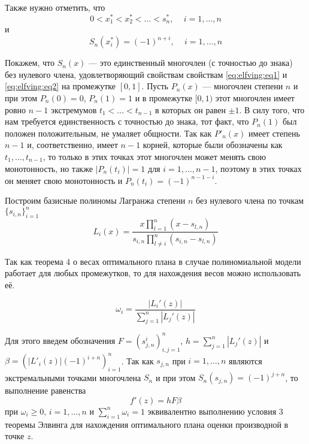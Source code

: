 \documentclass[specialist,
               substylefile = spbu.rtx,
               subf,href,colorlinks=true, 12pt]{disser}
\theoremstyle{definition}
\newcommand\abs[1]{\left\lvert#1\right\rvert}
\begin{document}
	Также нужно отметить, что
	\begin{equation*}
		0 < x_1^* < x_2^* < \ldots < s_n^* , \, \quad i = 1, \ldots, n 
	\end{equation*}
	и
	\begin{equation*}
		S_n(x_i^*) = (-1)^{n + i} , \, \quad i = 1, \ldots, n 
	\end{equation*}
	
	Покажем, что $S_n(x)$ --- это единственный многочлен (с точностью до знака) без нулевого члена, удовлетворяющий свойствам свойствам \eqref{eq:elfving:eq1} и \eqref{eq:elfving:eq2} на промежутке $[0, 1]$. Пусть $P_n(x)$ --- многочлен степени $n$ и при этом $P_n(0) = 0$, $P_n(1) = 1$ и в промежутке $[0, 1)$ этот многочлен имеет ровно $n-1$ экстремумов $t_1 < \ldots < t_{n-1}$ в которых он равен $\pm 1$. В силу того, что нам требуется единственность с точностью до знака, тот факт, что $P_n(1)$ был положен положительным, не умаляет общности. Так как $P'_n(x)$ имеет степень $n-1$ и, соответственно, имеет $n-1$ корней, которые были обозначены как $t_1, \ldots, t_{n-1}$, то только в этих точках этот многочлен может менять свою монотонность, но также $\abs{P_n(t_i)} = 1$ для $i = 1, \dots, n-1$, поэтому в этих точках он меняет свою монотонность и $P_n(t_i) = (-1)^{n-1-i}$. 
	

	Построим базисные полиномы Лагранжа степени $n$ без нулевого члена по точкам $\{s_{i, n}\}_{i=1}^n$
	\begin{equation*}
		L_{i}(x) = \frac{x \prod_{l=1}^n (x - s_{l,n})}{s_{i, n} \prod_{l \neq i}^n (s_{i,n} - s_{l,n})}
	\end{equation*}	
	
	Так как теорема 4 о весах оптимального плана в случае полиномиальной модели работает для любых промежутков, то для нахождения весов можно использовать её.
	
	\begin{equation*}
		\omega_i = \frac{\abs{L_i'(z)}}{\sum_{j=1}^n \abs{L_j'(z)}}
	\end{equation*}
	
	Для этого введем обозначения $F = \left(s_{j,n}^i\right)^n_{i, j = 1}$, $h = \sum_{j=1}^n \abs{L_j'(z)}$ и $\beta = \left( \abs{L'_i(z)} (-1)^{i+n} \right)_{i=1}^n$. Так как $s_{j, n}$ при $i = 1, \ldots , n$ являются экстремальными точками многочлена $S_n$ и при этом $S_n(s_{j, n}) = (-1)^{j+n}$, то выполнение равенства 
	\begin{equation}
		\label{th:mateq3}
		f'(z) = hF\beta
	\end{equation}
	 при $\omega_i \geqslant 0 , \, i = 1, \ldots, n$ и $ \sum_{i=1}^n \omega_i = 1$ эквивалентно выполнению условия 3 теоремы Элвинга для нахождения оптимального плана оценки производной в точке $z$.
	 
\end{document}
